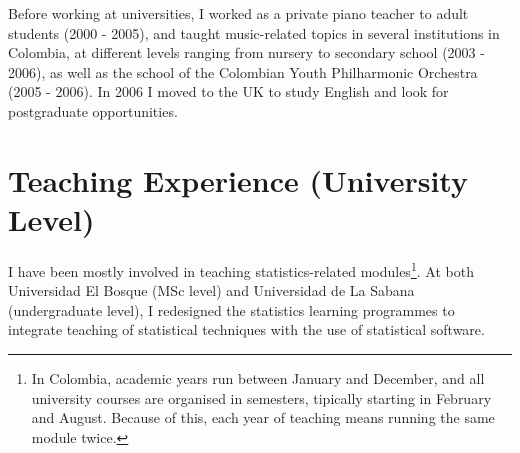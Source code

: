 \documentclass[11pt, a4paper]{awesome-cv}
\begin{document}
\begin{cventries}
{\begin{cvitems}
\end{cvitems}}
\end{cventries}

Before working at universities, I worked as a private piano teacher to
adult students (2000 - 2005), and taught music-related topics in several
institutions in Colombia, at different levels ranging from nursery to
secondary school (2003 - 2006), as well as the school of the Colombian
Youth Philharmonic Orchestra (2005 - 2006). In 2006 I moved to the UK to
study English and look for postgraduate opportunities.

\hypertarget{teaching-experience-university-level}{%
\section{Teaching Experience (University
Level)}\label{teaching-experience-university-level}}

I have been mostly involved in teaching statistics-related
modules\footnote{In Colombia, academic years run between January and
  December, and all university courses are organised in semesters,
  tipically starting in February and August. Because of this, each year
  of teaching means running the same module twice.}. At both Universidad
El Bosque (MSc level) and Universidad de La Sabana (undergraduate
level), I redesigned the statistics learning programmes to integrate
teaching of statistical techniques with the use of statistical software.
\end{document}
